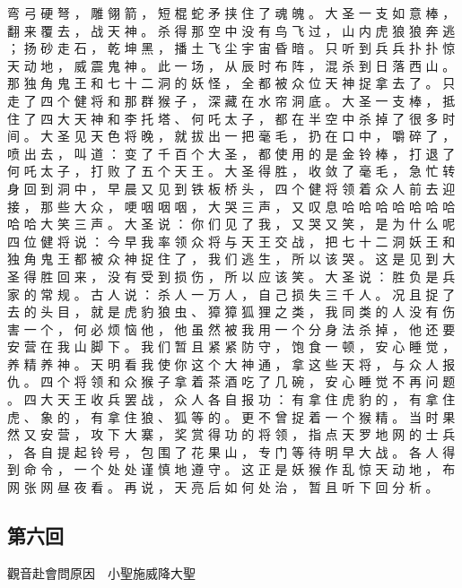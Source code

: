 {弯 弓 硬 弩 ， 雕 翎 箭 ， 短 棍 蛇 矛 挟 住 了 魂 魄 。
大 圣 一 支 如 意 棒 ， 翻 来 覆 去 ， 战 天 神 。
杀 得 那 空 中 没 有 鸟 飞 过 ， 山 内 虎 狼 狼 奔 逃 ； 扬 砂 走 石 ， 乾 坤 黑 ， 播 土 飞 尘 宇 宙 昏 暗 。
只 听 到 兵 兵 扑 扑 惊 天 动 地 ， 威 震 鬼 神 。
此 一 场 ， 从 辰 时 布 阵 ， 混 杀 到 日 落 西 山 。
那 独 角 鬼 王 和 七 十 二 洞 的 妖 怪 ， 全 都 被 众 位 天 神 捉 拿 去 了 。
只 走 了 四 个 健 将 和 那 群 猴 子 ， 深 藏 在 水 帘 洞 底 。
大 圣 一 支 棒 ， 抵 住 了 四 大 天 神 和 李 托 塔 、 何 吒 太 子 ， 都 在 半 空 中 杀 掉 了 很 多 时 间 。 大 圣 见 天 色 将 晚 ， 就 拔 出 一 把 毫 毛 ， 扔 在 口 中 ， 嚼 碎 了 ， 喷 出 去 ， 叫 道 ： 变 了 千 百 个 大 圣 ， 都 使 用 的 是 金 铃 棒 ， 打 退 了 何 吒 太 子 ， 打 败 了 五 个 天 王 。
大 圣 得 胜 ， 收 敛 了 毫 毛 ， 急 忙 转 身 回 到 洞 中 ， 早 晨 又 见 到 铁 板 桥 头 ， 四 个 健 将 领 着 众 人 前 去 迎 接 ， 那 些 大 众 ， 哽 咽 咽 咽 ， 大 哭 三 声 ， 又 叹 息 哈 哈 哈 哈 哈 哈 哈 哈 哈 大 笑 三 声 。
大 圣 说 ： 你 们 见 了 我 ， 又 哭 又 笑 ， 是 为 什 么 呢 四 位 健 将 说 ： 今 早 我 率 领 众 将 与 天 王 交 战 ， 把 七 十 二 洞 妖 王 和 独 角 鬼 王 都 被 众 神 捉 住 了 ， 我 们 逃 生 ， 所 以 该 哭 。
这 是 见 到 大 圣 得 胜 回 来 ， 没 有 受 到 损 伤 ， 所 以 应 该 笑 。
大 圣 说 ： 胜 负 是 兵 家 的 常 规 。
古 人 说 ： 杀 人 一 万 人 ， 自 己 损 失 三 千 人 。
况 且 捉 了 去 的 头 目 ， 就 是 虎 豹 狼 虫 、 獐 獐 狐 狸 之 类 ， 我 同 类 的 人 没 有 伤 害 一 个 ， 何 必 烦 恼 他 ， 他 虽 然 被 我 用 一 个 分 身 法 杀 掉 ， 他 还 要 安 营 在 我 山 脚 下 。
我 们 暂 且 紧 紧 防 守 ， 饱 食 一 顿 ， 安 心 睡 觉 ， 养 精 养 神 。
天 明 看 我 使 你 这 个 大 神 通 ， 拿 这 些 天 将 ， 与 众 人 报 仇 。
四 个 将 领 和 众 猴 子 拿 着 茶 酒 吃 了 几 碗 ， 安 心 睡 觉 不 再 问 题 。
四 大 天 王 收 兵 罢 战 ， 众 人 各 自 报 功 ： 有 拿 住 虎 豹 的 ， 有 拿 住 虎 、 象 的 ， 有 拿 住 狼 、 狐 等 的 。
更 不 曾 捉 着 一 个 猴 精 。
当 时 果 然 又 安 营 ， 攻 下 大 寨 ， 奖 赏 得 功 的 将 领 ， 指 点 天 罗 地 网 的 士 兵 ， 各 自 提 起 铃 号 ， 包 围 了 花 果 山 ， 专 门 等 待 明 早 大 战 。
各 人 得 到 命 令 ， 一 个 处 处 谨 慎 地 遵 守 。
这 正 是 妖 猴 作 乱 惊 天 动 地 ， 布 网 张 网 昼 夜 看 。
再 说 ， 天 亮 后 如 何 处 治 ， 暂 且 听 下 回 分 析 。
}\switchcolumn\flushpage  \begin{pinyinscope}{\myfontt \section{第六回}     觀音赴會問原因　小聖施威降大聖

}
\end{pinyinscope}
